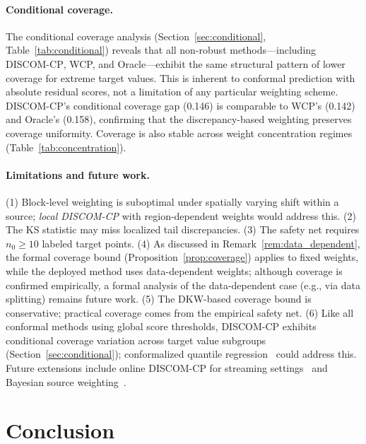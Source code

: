 \documentclass{article}
\newcommand{\DISCOM}{\textsc{DISCOM-CP}}
\begin{document}
\paragraph{Conditional coverage.}
The conditional coverage analysis (Section~\ref{sec:conditional}, Table~\ref{tab:conditional}) reveals that all non-robust methods---including \DISCOM{}, WCP, and Oracle---exhibit the same structural pattern of lower coverage for extreme target values. This is inherent to conformal prediction with absolute residual scores, not a limitation of any particular weighting scheme. \DISCOM{}'s conditional coverage gap (0.146) is comparable to WCP's (0.142) and Oracle's (0.158), confirming that the discrepancy-based weighting preserves coverage uniformity. Coverage is also stable across weight concentration regimes (Table~\ref{tab:concentration}).

\paragraph{Limitations and future work.}
(1) Block-level weighting is suboptimal under spatially varying shift within a source; \emph{local \DISCOM{}} with region-dependent weights would address this.
(2) The KS statistic may miss localized tail discrepancies.
(3) The safety net requires $n_0 \geq 10$ labeled target points.
(4) As discussed in Remark~\ref{rem:data_dependent}, the formal coverage bound (Proposition~\ref{prop:coverage}) applies to fixed weights, while the deployed method uses data-dependent weights; although coverage is confirmed empirically, a formal analysis of the data-dependent case (e.g., via data splitting) remains future work.
(5) The DKW-based coverage bound is conservative; practical coverage comes from the empirical safety net.
(6) Like all conformal methods using global score thresholds, \DISCOM{} exhibits conditional coverage variation across target value subgroups (Section~\ref{sec:conditional}); conformalized quantile regression~\citep{lei2018distribution} could address this.
Future extensions include online \DISCOM{} for streaming settings~\citep{cesabianchi2006prediction} and Bayesian source weighting~\citep{snell2025conformal}.

\section{Conclusion}
\end{document}
